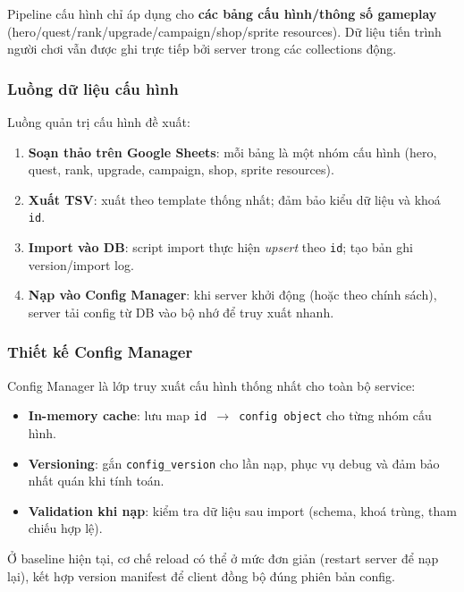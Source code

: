 Pipeline cấu hình chỉ áp dụng cho \textbf{các bảng cấu hình/\allowbreak thông số gameplay} (hero/\allowbreak quest/\allowbreak rank/\allowbreak upgrade/\allowbreak campaign/\allowbreak shop/\allowbreak sprite resources). Dữ liệu tiến trình người chơi vẫn được ghi trực tiếp bởi server trong các collections động.

\subsubsection{Luồng dữ liệu cấu hình}
\label{subsubsec:design-config-flow}

Luồng quản trị cấu hình đề xuất:
\begin{enumerate}
    \item \textbf{Soạn thảo trên Google Sheets}: mỗi bảng là một nhóm cấu hình (hero, quest, rank, upgrade, campaign, shop, sprite resources).
    \item \textbf{Xuất TSV}: xuất theo template thống nhất; đảm bảo kiểu dữ liệu và khoá \texttt{id}.
    \item \textbf{Import vào DB}: script import thực hiện \textit{upsert} theo \texttt{id}; tạo bản ghi version/\allowbreak import log.
    \item \textbf{Nạp vào Config Manager}: khi server khởi động (hoặc theo chính sách), server tải config từ DB vào bộ nhớ để truy xuất nhanh.
\end{enumerate}

\subsubsection{Thiết kế Config Manager}
\label{subsubsec:design-config-manager}

Config Manager là lớp truy xuất cấu hình thống nhất cho toàn bộ service:
\begin{itemize}
    \item \textbf{In-memory cache}: lưu map \texttt{id $\rightarrow$ config object} cho từng nhóm cấu hình.
    \item \textbf{Versioning}: gắn \texttt{config\_version} cho lần nạp, phục vụ debug và đảm bảo nhất quán khi tính toán.
    \item \textbf{Validation khi nạp}: kiểm tra dữ liệu sau import (schema, khoá trùng, tham chiếu hợp lệ).
\end{itemize}

Ở baseline hiện tại, cơ chế reload có thể ở mức đơn giản (restart server để nạp lại), kết hợp version manifest để client đồng bộ đúng phiên bản config.

